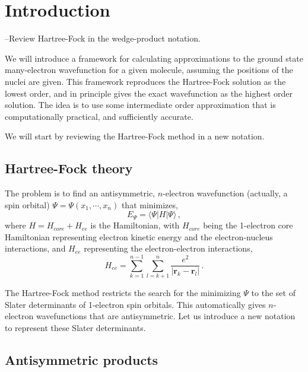 \documentclass[11pt]{article}
\begin{document}
\section{Introduction}

--Review Hartree-Fock in the wedge-product notation.

We will introduce a framework for calculating approximations to 
the ground state many-electron wavefunction for a given molecule, 
assuming the positions of the nuclei are given. This framework
reproduces the Hartree-Fock solution as the lowest order, and in
principle gives the exact wavefunction as the highest order
solution. The idea is to use some intermediate order approximation
that is computationally practical, and sufficiently accurate. 

We will start by reviewing the Hartree-Fock method in a new notation.

\subsection{Hartree-Fock theory}

The problem is to find an antisymmetric, $n$-electron wavefunction (actually, a spin orbital)
$\Psi =
\Psi(x_1, \cdots, x_n)$ that minimizes,
\begin{equation}
  E_\Psi = \langle \Psi | H | \Psi \rangle \,,
\end{equation}
where $H = H_{core} + H_{ee}$ is the Hamiltonian, with $H_{core}$
being the 1-electron core Hamiltonian representing electron kinetic energy
and the electron-nucleus interactions, and $H_{ee}$ representing the
electron-electron interactions,
\begin{equation}
  H_{ee} = \sum_{k=1}^{n-1} \sum_{l=k+1}^n \frac{e^2}{|\mathbf{r}_k - \mathbf{r}_l|}\,.
\end{equation}

The Hartree-Fock method restricts the search for the 
minimizing $\Psi$ to the set of Slater determinants of 1-electron spin
orbitals. This automatically gives $n$-electron wavefunctions that are
antisymmetric. Let us introduce a new notation to represent these
Slater determinants.

\subsection{Antisymmetric products}
\end{document}

